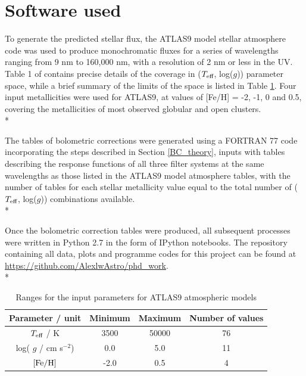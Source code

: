 \documentclass[12pt, a4paper]{report}
\begin{document}
\section{Software used}
To generate the predicted stellar flux, the ATLAS9 model stellar atmosphere code \citep{1993KurCD..13.....K} was used to produce monochromatic fluxes for a series of wavelengths ranging from 9 nm to 160,000 nm, with a resolution of 2 nm or less in the UV.  Table 1 of \cite{2004astro.ph..5087C} contains precise details of the coverage in ($T_{\textnormal{eff}}$, log($g$)) parameter space, while a brief summary  of the limits of the space is listed in Table \ref{atlas9_input}. Four input metallicities were used for ATLAS9, at values of [Fe/H] = -2, -1, 0 and 0.5, covering the metallicities of most observed globular and open clusters.\\*

The tables of bolometric corrections were generated using a FORTRAN 77 code incorporating the steps described in Section \ref{BC_theory}, inputs with tables describing the response functions of all three filter systems at the same wavelengths as those listed in the ATLAS9 model atmosphere tables, with the number of tables for each stellar metallicity value equal to the total number of ($T_{\textnormal{eff}}$, log($g$)) combinations available.\\*

Once the bolometric correction tables were produced, all subsequent processes were written in Python 2.7 in the form of IPython notebooks. The repository containing all data, plots and programme codes for this project can be found at \protect\url{https://github.com/AlexlwAstro/phd_work}.\\*


\begin{table}
\begin{center}
\begin{tabular}{cccc}
\hline
Parameter / unit & Minimum & Maximum & Number of values \\
\hline
$T_{\textnormal{eff}}$ / K & 3500 & 50000 & 76 \\
log( $g$ / cm s$^{-2}$) & 0.0 & 5.0 & 11 \\
$\textnormal{[Fe/H]}$ & -2.0 & 0.5 & 4 \\
\hline
\end{tabular}
\caption{Ranges for the input parameters for ATLAS9 atmospheric models}
\label{atlas9_input}
\end{center}
\end{table}
\end{document}
